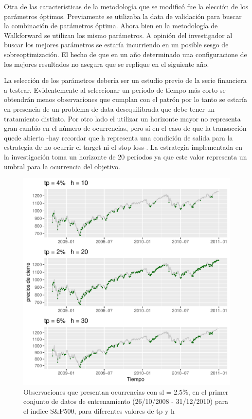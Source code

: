 \documentclass[a4paper,12pt]{Latex/Classes/PhDthesisPSnPDF}
\begin{document}
Otra de las características de la metodología que se modificó fue la elección de los parámetros óptimos. Previamente se utilizaba la data de validación para buscar la combinación de parámetros óptima. Ahora bien en la metodología de Walkforward se utilizan los mismo parámetros. A opinión del investigador al buscar los mejores parámetros se estaría incurriendo en un posible sesgo de sobreoptimización. El hecho de que en un año determinado una configuracione de los mejores resultados no asegura que se replique en el siguiente año.

La selección de los parámetros debería ser un estudio previo de la serie financiera a testear. Evidentemente al seleccionar un período de tiempo más corto se obtendrán menos observaciones que cumplan con el patrón por lo tanto se estaría en presencia de un problema de data desequilibrada que debe tener un tratamiento distinto. Por otro lado el utilizar un horizonte mayor no representa gran cambio en el número de ocurrencias, pero sí en el caso de que la transacción quede abierta -hay recordar que h representa una condición de salida para la estrategia de no ocurrir el target ni el stop loss-. La estrategia implementada en la investigación toma un horizonte de 20 períodos ya que este valor representa un umbral para la ocurrencia del objetivo.


\begin{figure}[H]
\centering
\includegraphics{main-003}
\caption{Observaciones que presentan ocurrencias con sl = 2.5\%, en el primer conjunto de datos de entrenamiento (26/10/2008 - 31/12/2010) para el índice S\&P500, para diferentes valores de tp y h}
\end{figure}
\end{document}
